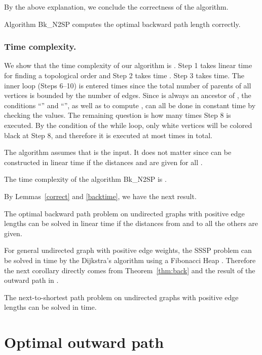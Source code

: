 By the above explanation, we conclude the correctness of the algorithm. 

\begin{lemma}\label{correct}
Algorithm Bk\_N2SP computes the optimal backward path length correctly.
\end{lemma}

\subsubsection*{Time complexity.}
We show that the time complexity of our algorithm is .
Step 1 takes linear time for finding a topological order and Step 2 takes  time \cite{als99}.
Step 3 takes  time.
The inner loop (Steps 6--10) is entered  times since the total number of parents of all vertices is bounded by the number of edges. Since  is always an ancestor of , the conditions ``'' and ``'', as well as to compute , can all be done in constant time by checking the  values. 
The remaining question is how many times Step 8 is executed.
By the condition of the while loop, only white vertices will be colored black at Step 8, and therefore it is executed at most  times in total.

The algorithm assumes that  is the input. 
It does not matter since  can be constructed in linear time if the distances  and  are given for all .
\begin{lemma}\label{backtime}
The time complexity of the algorithm Bk\_N2SP is .
\end{lemma}

By Lemmas~\ref{correct} and \ref{backtime}, we have the next result.
\begin{theorem}\label{thm:back}
The optimal backward path problem on undirected graphs with positive edge lengths can be solved in linear time if the distances from  and  to all the others are given.
\end{theorem}

For general undirected graph with positive edge weights, the SSSP problem can be solved in  time by the Dijkstra's algorithm using a Fibonacci Heap \cite{dijk}.
Therefore the next corollary directly comes from Theorem~\ref{thm:back} and the result of the outward path in \cite{kao10}. 
\begin{corollary}\label{cor:back}
The next-to-shortest path problem on undirected graphs with positive edge lengths can be solved in  time.
\end{corollary}


\section{Optimal outward path}

